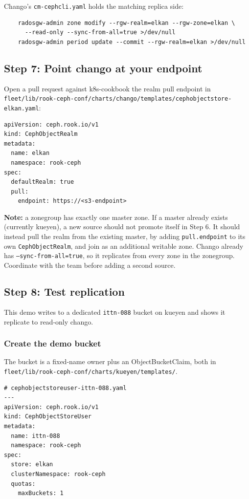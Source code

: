 Chango's \texttt{cm-cephcli.yaml} holds the matching replica side:

{\small
\begin{verbatim}
    radosgw-admin zone modify --rgw-realm=elkan --rgw-zone=elkan \
      --read-only --sync-from-all=true >/dev/null
    radosgw-admin period update --commit --rgw-realm=elkan >/dev/null
\end{verbatim}
}

\subsection{Step 7: Point chango at your endpoint}

Open a pull request against k8s-cookbook the realm pull endpoint in
\texttt{fleet/lib/rook-ceph-conf/charts/chango/templates/cephobjectstore-elkan.yaml}:

{\small
\begin{verbatim}
apiVersion: ceph.rook.io/v1
kind: CephObjectRealm
metadata:
  name: elkan
  namespace: rook-ceph
spec:
  defaultRealm: true
  pull:
    endpoint: https://<s3-endpoint>
\end{verbatim}
}

\textbf{Note:} a zonegroup has exactly one master zone. If a master already exists (currently kueyen), a new source should not promote itself in Step 6. It should instead pull the realm from the existing master, by adding \texttt{pull.endpoint} to its own \texttt{CephObjectRealm}, and join as an additional writable zone. Chango already has \texttt{--sync-from-all=true}, so it replicates from every zone in the zonegroup. Coordinate with the team before adding a second source.

\subsection{Step 8: Test replication}

This demo writes to a dedicated \texttt{ittn-088} bucket on kueyen and shows it replicate to read-only chango.

\subsubsection{Create the demo bucket}

The bucket is a fixed-name owner plus an ObjectBucketClaim, both in \texttt{fleet/lib/rook-ceph-conf/charts/kueyen/templates/}.

{\small
\begin{verbatim}
# cephobjectstoreuser-ittn-088.yaml
---
apiVersion: ceph.rook.io/v1
kind: CephObjectStoreUser
metadata:
  name: ittn-088
  namespace: rook-ceph
spec:
  store: elkan
  clusterNamespace: rook-ceph
  quotas:
    maxBuckets: 1
\end{verbatim}
}

